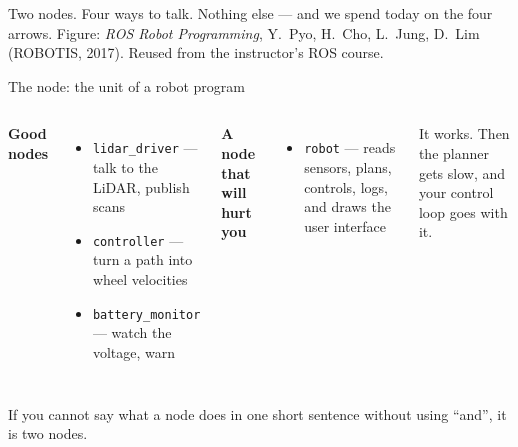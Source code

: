 \documentclass[aspectratio=169]{beamer}
\newcommand{\pyocredit}{Figure: \emph{ROS Robot Programming}, Y.~Pyo,
  H.~Cho, L.~Jung, D.~Lim (ROBOTIS, 2017). Reused from the instructor's ROS course.}
\begin{document}
  {Two nodes. Four ways to talk. Nothing else --- and we spend today on the four arrows.}
  {\pyocredit}

\begin{frame}{The node: the unit of a robot program}

  \vspace{0.9em}
  \begin{columns}[T,onlytextwidth]
    \textbf{Good nodes}
    \begin{itemize}\footnotesize
      \item \texttt{lidar\_driver} --- talk to the LiDAR, publish scans
      \item \texttt{controller} --- turn a path into wheel velocities
      \item \texttt{battery\_monitor} --- watch the voltage, warn
    \end{itemize}

    \textbf{A node that will hurt you}
    \begin{itemize}\footnotesize
      \item \texttt{robot} --- reads sensors, plans, controls, logs, and draws the user
            interface
    \end{itemize}
    \vspace{0.3em}
    {\footnotesize It works. Then the planner gets slow, and your control loop goes with it.}
  \end{columns}

  \vspace{0.9em}
  \begin{underhood}
    \footnotesize
    If you cannot say what a node does in one short sentence without using ``and'', it is
    two nodes.
  \end{underhood}
\end{frame}
\end{document}
